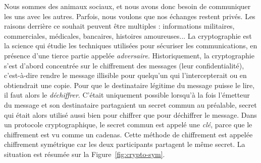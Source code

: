 Nous sommes des animaux sociaux, et nous avons donc besoin de communiquer les
uns avec les autres. Parfois, nous voulons que nos échanges restent privés.
Les raisons derrière ce souhait peuvent être multiples : informations
militaires, commerciales, médicales, bancaires, histoires amoureuses... La
cryptographie est la science qui étudie les techniques utilisées pour sécuriser
les communications, en présence d'une tierce partie appelée \emph{adversaire}.
Historiquement, la cryptographie s'est d'abord concentrée sur le chiffrement des
messages (leur confidentialité), c'est-à-dire rendre le message illisible pour
quelqu'un qui l'intercepterait ou en obtiendrait une copie. Pour que le
destinataire légitime du message puisse le lire, il faut alors le
\emph{déchiffrer}. C'était uniquement possible lorsqu'à la fois l'émetteur du
message et son destinataire partagaient un secret commun au préalable, secret
qui était alors utilisé aussi bien pour chiffrer que pour déchiffrer le message.
Dans un protocole cryptographique, le secret commun est appelé une
\emph{clé}, parce que le chiffrement est vu comme un cadenas. Cette méthode de
chiffrement est appelée chiffrement symétrique car les deux participants
partagent le même secret. La situation est résumée sur la
Figure~\ref{fig:crypto-sym}.
